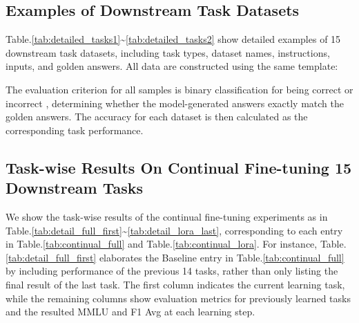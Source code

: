 \documentclass[10pt,journal,compsoc]{IEEEtran}
\begin{document}
\subsection{Examples of Downstream Task Datasets}
Table.\ref{tab:detailed_tasks1}\textasciitilde\ref{tab:detailed_tasks2} show detailed examples of 15 downstream task datasets, including task types, dataset names, instructions, inputs, and golden answers.
All data are constructed using the same template:


\noindent The evaluation criterion for all samples is binary classification for being correct or incorrect , determining whether the model-generated answers exactly match the golden answers. The accuracy for each dataset is then calculated as the corresponding task performance.



\subsection{Task-wise Results On Continual Fine-tuning 15 Downstream Tasks}

We show the task-wise results of the continual fine-tuning experiments as in Table.\ref{tab:detail_full_first}\textasciitilde\ref{tab:detail_lora_last}, corresponding to each entry in Table.\ref{tab:continual_full} and Table.\ref{tab:continual_lora}. For instance, Table.\ref{tab:detail_full_first} elaborates the Baseline entry in Table.\ref{tab:continual_full} by including performance of the previous 14 tasks, rather than only listing the final result of the last task. 
The first column indicates the current learning task, while the remaining columns show evaluation metrics for previously learned tasks and the resulted MMLU and F1 Avg at each learning step.



\end{document}
